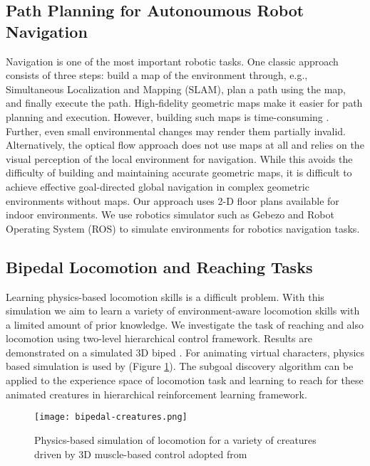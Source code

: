 \documentclass[letterpaper,titlepage]{article}
\begin{document}
\subsection{Path Planning for Autonoumous Robot Navigation}
Navigation is one of the most important robotic tasks. One classic approach consists of three steps: build a map of the environment through, e.g., Simultaneous Localization and Mapping (SLAM), plan a path using the map, and finally execute the path. High-fidelity geometric maps make it easier for path planning and execution. However, building such maps is time-consuming \citep{ROBOT-NAVIGATION-Intention-Net:2017}. Further, even small environmental changes may render them partially invalid. Alternatively, the optical flow approach does not use maps at all and relies on the visual perception of the local environment for navigation. While this avoids the difficulty of building and maintaining accurate geometric maps, it is difficult to achieve effective goal-directed global navigation in complex geometric environments without maps. Our approach uses 2-D floor plans available for indoor environments. We use robotics simulator such as Gebezo and Robot Operating System (ROS) to simulate environments for robotics navigation tasks. 

\subsection{Bipedal Locomotion and Reaching Tasks}
Learning physics-based locomotion skills is a difficult problem. With this simulation we aim to learn a variety of environment-aware locomotion skills with a limited amount of prior knowledge. We investigate the task of reaching and also locomotion using two-level hierarchical control framework. Results are demonstrated on a simulated 3D biped \citep{Deep-LOCO:Peng:2017,bipedal-creatures:Geijtenbeek:2013}.
For animating virtual characters, physics based simulation is used by \citep{bipedal-creatures:Geijtenbeek:2013} (Figure \ref{g:bipedal-creatures}). The subgoal discovery algorithm can be applied to the experience space of locomotion task and learning to reach for these animated creatures in hierarchical reinforcement learning framework.  
\begin{figure}[H]
\centering
\texttt{[image: bipedal-creatures.png]}
\caption{Physics-based simulation of locomotion for a variety of creatures driven by 3D muscle-based control adopted from \citep{bipedal-creatures:Geijtenbeek:2013}}
\label{g:bipedal-creatures}
\end{figure}
\end{document}
